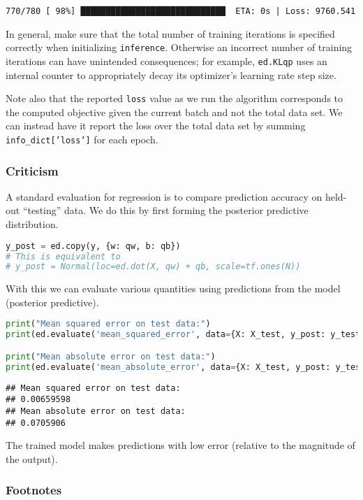 \begin{lstlisting}
770/780 [ 98%] █████████████████████████████  ETA: 0s | Loss: 9760.541
\end{lstlisting}

In general, make sure that the total number of training iterations is
specified correctly when initializing \texttt{inference}. Otherwise an incorrect
number of training iterations can have unintended consequences; for example,
\texttt{ed.KLqp} uses an internal counter to appropriately decay its optimizer's
learning rate step size.

Note also that the reported \texttt{loss} value as we run the
algorithm corresponds to the computed objective given the current
batch and not the total data set. We can instead have it report
the loss over the total data set by summing \texttt{info_dict['loss']}
for each epoch.

\subsubsection{Criticism}

A standard evaluation for regression is to compare prediction accuracy on
held-out ``testing'' data. We do this by first forming the posterior predictive
distribution.
\begin{lstlisting}[language=Python]
y_post = ed.copy(y, {w: qw, b: qb})
# This is equivalent to
# y_post = Normal(loc=ed.dot(X, qw) + qb, scale=tf.ones(N))
\end{lstlisting}

With this we can evaluate various quantities using predictions from
the model (posterior predictive).
\begin{lstlisting}[language=Python]
print("Mean squared error on test data:")
print(ed.evaluate('mean_squared_error', data={X: X_test, y_post: y_test}))

print("Mean absolute error on test data:")
print(ed.evaluate('mean_absolute_error', data={X: X_test, y_post: y_test}))
\end{lstlisting}

\begin{lstlisting}
## Mean squared error on test data:
## 0.00659598
## Mean absolute error on test data:
## 0.0705906
\end{lstlisting}

The trained model makes predictions with low error
(relative to the magnitude of the output).

\subsubsection{Footnotes}

